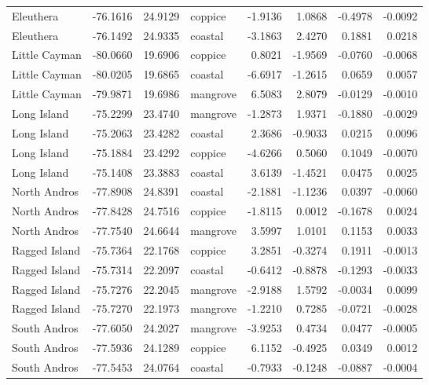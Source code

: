 \begin{table}[H]
\begin{tabular}{lrrlrrrr}
        Eleuthera & -76.1616 & 24.9129 & coppice & -1.9136 & 1.0868 & -0.4978 & -0.0092\\
        Eleuthera & -76.1492 & 24.9335 & coastal & -3.1863 & 2.4270 & 0.1881 & 0.0218\\
        Little Cayman & -80.0660 & 19.6906 & coppice & 0.8021 & -1.9569 & -0.0760 & -0.0068\\
        Little Cayman & -80.0205 & 19.6865 & coastal & -6.6917 & -1.2615 & 0.0659 & 0.0057\\
        Little Cayman & -79.9871 & 19.6986 & mangrove & 6.5083 & 2.8079 & -0.0129 & -0.0010\\
        Long Island & -75.2299 & 23.4740 & mangrove & -1.2873 & 1.9371 & -0.1880 & -0.0029\\
        Long Island & -75.2063 & 23.4282 & coastal & 2.3686 & -0.9033 & 0.0215 & 0.0096\\
        Long Island & -75.1884 & 23.4292 & coppice & -4.6266 & 0.5060 & 0.1049 & -0.0070\\
        Long Island & -75.1408 & 23.3883 & coastal & 3.6139 & -1.4521 & 0.0475 & 0.0025\\
        North Andros & -77.8908 & 24.8391 & coastal & -2.1881 & -1.1236 & 0.0397 & -0.0060\\
        North Andros & -77.8428 & 24.7516 & coppice & -1.8115 & 0.0012 & -0.1678 & 0.0024\\
        North Andros & -77.7540 & 24.6644 & mangrove & 3.5997 & 1.0101 & 0.1153 & 0.0033\\
        Ragged Island & -75.7364 & 22.1768 & coppice & 3.2851 & -0.3274 & 0.1911 & -0.0013\\
        Ragged Island & -75.7314 & 22.2097 & coastal & -0.6412 & -0.8878 & -0.1293 & -0.0033\\
        Ragged Island & -75.7276 & 22.2045 & mangrove & -2.9188 & 1.5792 & -0.0034 & 0.0099\\
        Ragged Island & -75.7270 & 22.1973 & mangrove & -1.2210 & 0.7285 & -0.0721 & -0.0028\\
        South Andros & -77.6050 & 24.2027 & mangrove & -3.9253 & 0.4734 & 0.0477 & -0.0005\\
        South Andros & -77.5936 & 24.1289 & coppice & 6.1152 & -0.4925 & 0.0349 & 0.0012\\
        South Andros & -77.5453 & 24.0764 & coastal & -0.7933 & -0.1248 & -0.0887 & -0.0004\\
        \hline
    \end{tabular}
    \label{suptab:locations}
\end{table}

